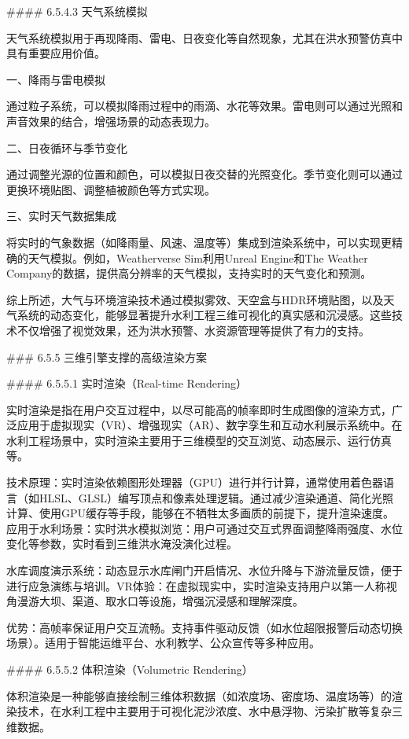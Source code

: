 \#\#\#\# 6.5.4.3 天气系统模拟

天气系统模拟用于再现降雨、雷电、日夜变化等自然现象，尤其在洪水预警仿真中具有重要应用价值。

一、降雨与雷电模拟

通过粒子系统，可以模拟降雨过程中的雨滴、水花等效果。雷电则可以通过光照和声音效果的结合，增强场景的动态表现力。

二、日夜循环与季节变化

通过调整光源的位置和颜色，可以模拟日夜交替的光照变化。季节变化则可以通过更换环境贴图、调整植被颜色等方式实现。

三、实时天气数据集成

将实时的气象数据（如降雨量、风速、温度等）集成到渲染系统中，可以实现更精确的天气模拟。例如，Weatherverse Sim利用Unreal Engine和The Weather Company的数据，提供高分辨率的天气模拟，支持实时的天气变化和预测。

综上所述，大气与环境渲染技术通过模拟雾效、天空盒与HDR环境贴图，以及天气系统的动态变化，能够显著提升水利工程三维可视化的真实感和沉浸感。这些技术不仅增强了视觉效果，还为洪水预警、水资源管理等提供了有力的支持。

\#\#\# 6.5.5 三维引擎支撑的高级渲染方案

\#\#\#\# 6.5.5.1 实时渲染（Real-time Rendering）

实时渲染是指在用户交互过程中，以尽可能高的帧率即时生成图像的渲染方式，广泛应用于虚拟现实（VR）、增强现实（AR）、数字孪生和互动水利展示系统中。在水利工程场景中，实时渲染主要用于三维模型的交互浏览、动态展示、运行仿真等。

技术原理：实时渲染依赖图形处理器（GPU）进行并行计算，通常使用着色器语言（如HLSL、GLSL）编写顶点和像素处理逻辑。通过减少渲染通道、简化光照计算、使用GPU缓存等手段，能够在不牺牲太多画质的前提下，提升渲染速度。应用于水利场景：实时洪水模拟浏览：用户可通过交互式界面调整降雨强度、水位变化等参数，实时看到三维洪水淹没演化过程。

水库调度演示系统：动态显示水库闸门开启情况、水位升降与下游流量反馈，便于进行应急演练与培训。VR体验：在虚拟现实中，实时渲染支持用户以第一人称视角漫游大坝、渠道、取水口等设施，增强沉浸感和理解深度。

优势：高帧率保证用户交互流畅。支持事件驱动反馈（如水位超限报警后动态切换场景）。适用于智能运维平台、水利教学、公众宣传等多种应用。

\#\#\#\# 6.5.5.2 体积渲染（Volumetric Rendering）

体积渲染是一种能够直接绘制三维体积数据（如浓度场、密度场、温度场等）的渲染技术，在水利工程中主要用于可视化泥沙浓度、水中悬浮物、污染扩散等复杂三维数据。

